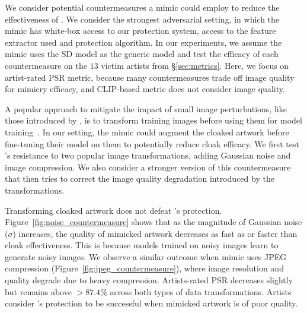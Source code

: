 We consider potential countermeasures a mimic could employ to reduce the
effectiveness of \system. We consider the strongest adversarial setting, in
which the mimic has white-box access to our protection system, \ie access to
the feature extractor used and protection algorithm. In our experiments, we
assume the mimic uses the SD model as the generic model and test the efficacy
of each countermeasure on the $13$ victim artists from
\S\ref{sec:metrics}. Here, we focus on artist-rated PSR metric, because many
countermeasures trade off image quality for mimicry efficacy, and
CLIP-based metric does not consider image quality.

 A popular approach to mitigate the impact of
small image perturbations, like those introduced by \system{}, is to
transform training images before using them for model
training~\cite{carlini2017adversarial,feinman2017detecting}. In our setting,
the mimic could augment the cloaked artwork before fine-tuning their model on
them to potentially reduce cloak efficacy. We first test \system{}'s
resistance to two popular image transformations, adding Gaussian noise and
image compression. We also consider a stronger version of this countermeasure
that then tries to correct the image quality degradation introduced by the
transformations.

Transforming cloaked artwork does not defeat \system{}'s
protection. Figure~\ref{fig:noise_countermeasure} shows that as the magnitude
of Gaussian noise ($\sigma$) increases, the quality of mimicked artwork
decreases as fast as or faster than cloak effectiveness. This is because
models trained on noisy images learn to generate noisy images. We observe a
similar outcome when mimic uses JPEG compression
(Figure~\ref{fig:jpeg_countermeasure}), where image resolution and quality
degrade due to heavy compression. Artists-rated PSR decreases slightly but
remains above $>87.4\%$ across both types of data transformations. Artists
consider \system{}'s protection to be successful when mimicked artwork is of
poor quality.  

